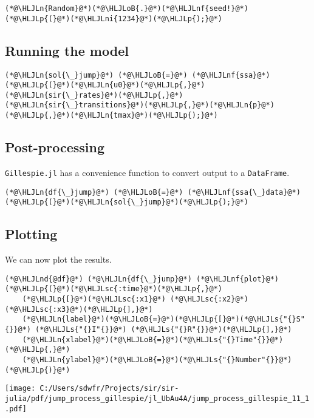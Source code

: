 \documentclass[12pt,a4paper]{article}
\newcommand{\HLJLn}[1]{#1}
\newcommand{\HLJLnd}[1]{\textcolor[RGB]{214,102,97}{#1}}
\newcommand{\HLJLnf}[1]{\textcolor[RGB]{66,102,213}{#1}}
\newcommand{\HLJLs}[1]{\textcolor[RGB]{201,61,57}{#1}}
\newcommand{\HLJLsc}[1]{\textcolor[RGB]{201,61,57}{#1}}
\newcommand{\HLJLni}[1]{\textcolor[RGB]{59,151,46}{#1}}
\newcommand{\HLJLoB}[1]{\textcolor[RGB]{102,102,102}{\textbf{#1}}}
\newcommand{\HLJLp}[1]{#1}
\begin{document}
\begin{lstlisting}
(*@\HLJLn{Random}@*)(*@\HLJLoB{.}@*)(*@\HLJLnf{seed!}@*)(*@\HLJLp{(}@*)(*@\HLJLni{1234}@*)(*@\HLJLp{);}@*)
\end{lstlisting}


\subsection{Running the model}

\begin{lstlisting}
(*@\HLJLn{sol{\_}jump}@*) (*@\HLJLoB{=}@*) (*@\HLJLnf{ssa}@*)(*@\HLJLp{(}@*)(*@\HLJLn{u0}@*)(*@\HLJLp{,}@*)(*@\HLJLn{sir{\_}rates}@*)(*@\HLJLp{,}@*)(*@\HLJLn{sir{\_}transitions}@*)(*@\HLJLp{,}@*)(*@\HLJLn{p}@*)(*@\HLJLp{,}@*)(*@\HLJLn{tmax}@*)(*@\HLJLp{);}@*)
\end{lstlisting}


\subsection{Post-processing}
\texttt{Gillespie.jl} has a convenience function to convert output to a \texttt{DataFrame}.


\begin{lstlisting}
(*@\HLJLn{df{\_}jump}@*) (*@\HLJLoB{=}@*) (*@\HLJLnf{ssa{\_}data}@*)(*@\HLJLp{(}@*)(*@\HLJLn{sol{\_}jump}@*)(*@\HLJLp{);}@*)
\end{lstlisting}


\subsection{Plotting}
We can now plot the results.


\begin{lstlisting}
(*@\HLJLnd{@df}@*) (*@\HLJLn{df{\_}jump}@*) (*@\HLJLnf{plot}@*)(*@\HLJLp{(}@*)(*@\HLJLsc{:time}@*)(*@\HLJLp{,}@*)
    (*@\HLJLp{[}@*)(*@\HLJLsc{:x1}@*) (*@\HLJLsc{:x2}@*) (*@\HLJLsc{:x3}@*)(*@\HLJLp{],}@*)
    (*@\HLJLn{label}@*)(*@\HLJLoB{=}@*)(*@\HLJLp{[}@*)(*@\HLJLs{"{}S"{}}@*) (*@\HLJLs{"{}I"{}}@*) (*@\HLJLs{"{}R"{}}@*)(*@\HLJLp{],}@*)
    (*@\HLJLn{xlabel}@*)(*@\HLJLoB{=}@*)(*@\HLJLs{"{}Time"{}}@*)(*@\HLJLp{,}@*)
    (*@\HLJLn{ylabel}@*)(*@\HLJLoB{=}@*)(*@\HLJLs{"{}Number"{}}@*)(*@\HLJLp{)}@*)
\end{lstlisting}

\texttt{[image: C:/Users/sdwfr/Projects/sir/sir-julia/pdf/jump\_process\_gillespie/jl\_UbAu4A/jump\_process\_gillespie\_11\_1.pdf]}
\end{document}
